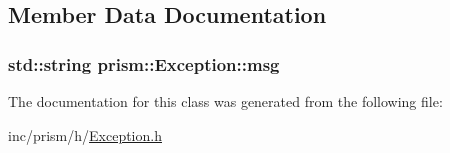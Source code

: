 \subsection{Member Data Documentation}
\subsubsection[{\texorpdfstring{msg}{msg}}]{\setlength{\rightskip}{0pt plus 5cm}std\+::string prism\+::\+Exception\+::msg\hspace{0.3cm}{\ttfamily [protected]}}\hypertarget{classprism_1_1_exception_ab768e96bc8a3f617b3420e19a18caf9f}{}\label{classprism_1_1_exception_ab768e96bc8a3f617b3420e19a18caf9f}


The documentation for this class was generated from the following file\+:\begin{DoxyCompactItemize}
\item 
inc/prism/h/\hyperlink{_exception_8h}{Exception.\+h}\end{DoxyCompactItemize}
